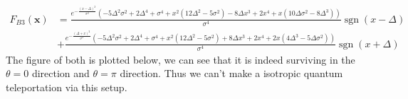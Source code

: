 \documentclass[a4paper,12pt]{article}
\begin{document}
{\footnotesize\begin{align*}
    F_{B3}(\mathbf{x}) &= \frac{e^{-\frac{(x-\Delta )^2}{\sigma ^2}} \left(-5 \Delta ^2 \sigma ^2+2 \Delta ^4+\sigma ^4+x^2 \left(12 \Delta ^2-5 \sigma ^2\right)-8 \Delta  x^3+2 x^4+x \left(10 \Delta  \sigma ^2-8 \Delta ^3\right)\right)}{\sigma ^4}\operatorname{sgn}(x - \Delta)\\
    &+\frac{e^{-\frac{(\Delta +x)^2}{\sigma ^2}} \left(-5 \Delta ^2 \sigma ^2+2 \Delta ^4+\sigma ^4+x^2 \left(12 \Delta ^2-5 \sigma ^2\right)+8 \Delta  x^3+2 x^4+2 x \left(4 \Delta ^3-5 \Delta  \sigma ^2\right)\right)}{\sigma ^4}\operatorname{sgn}(x + \Delta) 
\end{align*}}
The figure of both is plotted below, we can see that it is indeed surviving in the \(\theta = 0\) direction and \(\theta = \pi\) direction. Thus we can't make a isotropic quantum teleportation via this setup.


\appendix

\acknowledgments






\end{document}
